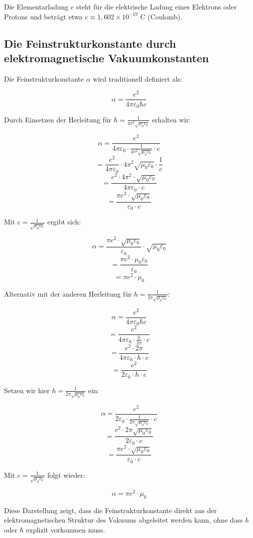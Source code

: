 \documentclass{article}
\begin{document}
	Die Elementarladung $e$ steht für die elektrische Ladung eines Elektrons oder Protons und beträgt etwa $e \approx 1,602 \times 10^{-19}$ C (Coulomb).
	
	\subsection{Die Feinstrukturkonstante durch elektromagnetische Vakuumkonstanten}
	
	Die Feinstrukturkonstante $\alpha$ wird traditionell definiert als:
	
	$$\alpha = \frac{e^2}{4\pi\varepsilon_0\hbar c}$$
	
	Durch Einsetzen der Herleitung für $\hbar = \frac{1}{4\pi^2\sqrt{\mu_0\varepsilon_0}}$ erhalten wir:
	
	$$\alpha = \frac{e^2}{4\pi\varepsilon_0 \cdot \frac{1}{4\pi^2\sqrt{\mu_0\varepsilon_0}} \cdot c}$$
	$$= \frac{e^2}{4\pi\varepsilon_0} \cdot 4\pi^2\sqrt{\mu_0\varepsilon_0} \cdot \frac{1}{c}$$
	$$= \frac{e^2 \cdot 4\pi^2 \cdot \sqrt{\mu_0\varepsilon_0}}{4\pi\varepsilon_0 \cdot c}$$
	$$= \frac{\pi e^2 \cdot \sqrt{\mu_0\varepsilon_0}}{\varepsilon_0 \cdot c}$$
	
	Mit $c = \frac{1}{\sqrt{\mu_0\varepsilon_0}}$ ergibt sich:
	
	$$\alpha = \frac{\pi e^2 \cdot \sqrt{\mu_0\varepsilon_0}}{\varepsilon_0} \cdot \sqrt{\mu_0\varepsilon_0}$$
	$$= \frac{\pi e^2 \cdot \mu_0\varepsilon_0}{\varepsilon_0}$$
	$$= \pi e^2 \cdot \mu_0$$
	
	Alternativ mit der anderen Herleitung für $h = \frac{1}{2\pi\sqrt{\mu_0\varepsilon_0}}$:
	
	$$\alpha = \frac{e^2}{4\pi\varepsilon_0\hbar c}$$
	$$= \frac{e^2}{4\pi\varepsilon_0 \cdot \frac{h}{2\pi} \cdot c}$$
	$$= \frac{e^2 \cdot 2\pi}{4\pi\varepsilon_0 \cdot h \cdot c}$$
	$$= \frac{e^2}{2\varepsilon_0 \cdot h \cdot c}$$
	
	Setzen wir hier $h = \frac{1}{2\pi\sqrt{\mu_0\varepsilon_0}}$ ein:
	
	$$\alpha = \frac{e^2}{2\varepsilon_0 \cdot \frac{1}{2\pi\sqrt{\mu_0\varepsilon_0}} \cdot c}$$
	$$= \frac{e^2 \cdot 2\pi\sqrt{\mu_0\varepsilon_0}}{2\varepsilon_0 \cdot c}$$
	$$= \frac{\pi e^2 \cdot \sqrt{\mu_0\varepsilon_0}}{\varepsilon_0 \cdot c}$$
	
	Mit $c = \frac{1}{\sqrt{\mu_0\varepsilon_0}}$ folgt wieder:
	
	$$\alpha = \pi e^2 \cdot \mu_0$$
	
	Diese Darstellung zeigt, dass die Feinstrukturkonstante direkt aus der elektromagnetischen Struktur des Vakuums abgeleitet werden kann, ohne dass $h$ oder $\hbar$ explizit vorkommen muss.
	
\end{document}
